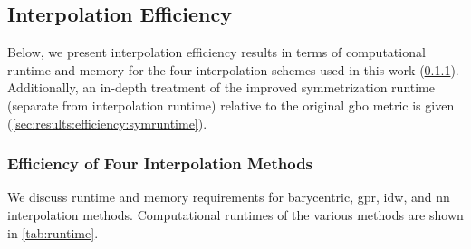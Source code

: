 \documentclass[final,twocolumn,12pt]{elsarticle}
\begin{document}
\subsection{Interpolation Efficiency}
\label{sec:results:efficiency}

Below, we present interpolation efficiency results in terms of computational runtime and memory for the four interpolation schemes used in this work (\cref{sec:results:efficiency:methods}). Additionally, an in-depth treatment of the improved symmetrization runtime (separate from interpolation runtime) relative to the original \gls{gbo} metric is given (\cref{sec:results:efficiency:symruntime}).

\subsubsection{Efficiency of Four Interpolation Methods}
\label{sec:results:efficiency:methods}

We discuss runtime and memory requirements for barycentric, \gls{gpr}, \gls{idw}, and \gls{nn} interpolation methods. Computational runtimes of the various methods are shown in \cref{tab:runtime}.
\end{document}
